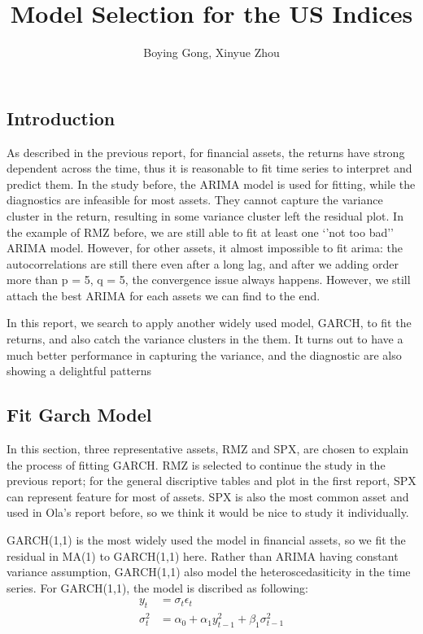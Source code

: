\documentclass[12pt]{article}
\title{Model Selection for the US Indices}
\author{Boying Gong, Xinyue Zhou}
\begin{document}
\maketitle

\fi

\subsection{Introduction}
As described in the previous report, for financial assets, the returns have strong dependent across the time, thus it is reasonable to fit time series to interpret and predict them. In the study before,  the ARIMA model is used for fitting, while the diagnostics are infeasible for most assets. They cannot capture the variance cluster in the return, resulting in some variance cluster left the residual plot. In the example of RMZ  before, we are still able to fit at least one `'not too bad'' ARIMA model. However, for other assets, it almost impossible to fit arima: the autocorrelations are still there even after a long lag, and after we adding order more than p = 5, q = 5, the convergence issue always happens. However, we still attach the best ARIMA for each assets we can find to the end.

In this report, we search to apply another widely used model, GARCH,  to fit the returns, and also catch the variance clusters in the them. It turns out to have a much better performance in capturing the variance, and the diagnostic are also showing a delightful patterns


\subsection{Fit Garch Model}
In this section,  three representative assets, RMZ and SPX, are chosen to explain the process of fitting GARCH. RMZ is selected to continue the study in the previous report; for the general discriptive tables and plot in the first report, SPX can represent feature for most of assets. SPX is also the most common asset and used in Ola's report before, so we think it would be nice to study it individually.

GARCH(1,1) is the most widely used the model in financial assets, so we fit the residual in MA(1) to GARCH(1,1) here. Rather than ARIMA having constant variance assumption, GARCH(1,1) also model the heteroscedasiticity in the time series.  For GARCH(1,1), the model is discribed as following:
\begin{align*}
y_t & = \sigma_t \epsilon_t\\
\sigma_t^2 & = \alpha_0+ \alpha_1 y_{t-1}^2 +\beta_1\sigma_{t-1}^2
\end{align*}
\end{document}
